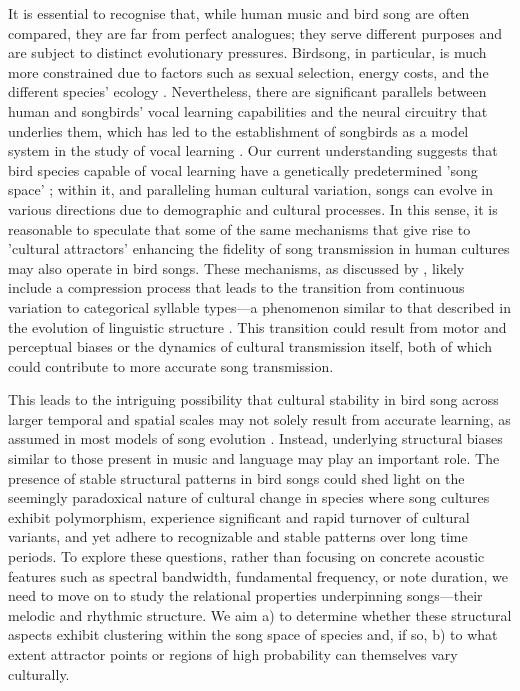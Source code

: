 It is essential to recognise that, while human music and bird song are often compared, they are far from perfect analogues; they serve different purposes and are subject to distinct evolutionary pressures. Birdsong, in particular, is much more constrained due to factors such as sexual selection, energy costs, and the different species' ecology \autocite{verzijden2012, demery2021, nowicki1998, spencer2003, sierro2023}. Nevertheless, there are significant parallels between human and songbirds' vocal learning capabilities and the neural circuitry that underlies them, which has led to the establishment of songbirds as a model system in the study of vocal learning \autocite{jarvis2019, rouse2021}. Our current understanding suggests that bird species capable of vocal learning have a genetically predetermined 'song space' \autocite{james2017, lachlan2010}; within it, and paralleling human cultural variation, songs can evolve in various directions due to demographic and cultural processes. In this sense, it is reasonable to speculate that some of the same mechanisms that give rise to 'cultural attractors' enhancing the fidelity of song transmission in human cultures may also operate in bird songs. These mechanisms, as discussed by \autocite{tchernichovski2017}, likely include a compression process that leads to the transition from continuous variation to categorical syllable types---a phenomenon similar to that described in the evolution of linguistic structure \autocite{gibson2019, decastro-arrazola2019, kirby2017, tamariz2016, silvey2019}. This transition could result from motor and perceptual biases or the dynamics of cultural transmission itself, both of which could contribute to more accurate song transmission.

This leads to the intriguing possibility that cultural stability in bird song across larger temporal and spatial scales may not solely result from accurate learning, as assumed in most models of song evolution \autocite{lachlan2018, hudson2022, pichkar2023, youngblood2022}. Instead, underlying structural biases similar to those present in music and language may play an important role. The presence of stable structural patterns in bird songs could shed light on the seemingly paradoxical nature of cultural change in species where song cultures exhibit polymorphism, experience significant and rapid turnover of cultural variants, and yet adhere to recognizable and stable patterns over long time periods. To explore these questions, rather than focusing on concrete acoustic features such as spectral bandwidth, fundamental frequency, or note duration, we need to move on to study the relational properties underpinning songs---their melodic and rhythmic structure. We aim a) to determine whether these structural aspects exhibit clustering within the song space of species and, if so, b) to what extent attractor points or regions of high probability can themselves vary culturally. 

